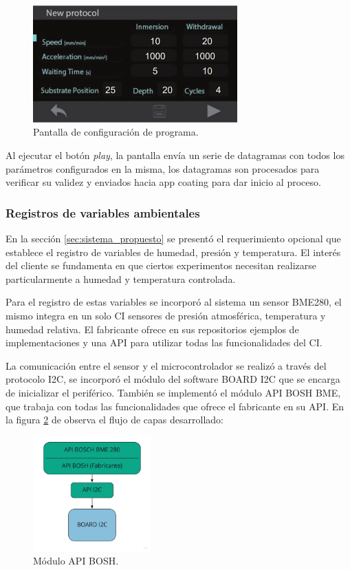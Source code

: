 \begin{figure}[h!]
	\centering
	\includegraphics[width=0.7\textwidth]{./Figures/pantalla.png}
	\caption{Pantalla de configuración de programa.}
	\label{fig:stone_a}
\end{figure}  

Al ejecutar el botón \textit{play}, la pantalla envía un serie de datagramas con todos los parámetros configurados en la misma, los datagramas son procesados para verificar su validez y enviados hacia app coating para dar inicio al proceso. 
 

\subsubsection{Registros de variables ambientales}

En la sección \ref{sec:sistema_propuesto} se presentó el requerimiento opcional que establece el registro de variables de humedad, presión y temperatura. El interés del cliente se fundamenta en que ciertos experimentos necesitan realizarse particularmente a humedad y temperatura controlada. 

Para el registro de estas variables se incorporó al sistema un sensor BME280, el mismo integra en un solo CI sensores de presión atmosférica, temperatura y humedad relativa. El fabricante ofrece en sus repositorios \citep{web_repositorio_api_bosh} ejemplos de implementaciones y una API para utilizar todas las funcionalidades del CI.

La comunicación entre el sensor y el microcontrolador se realizó a través del protocolo I2C, se incorporó el módulo del software BOARD I2C que se encarga de inicializar el periférico. También se implementó el módulo API BOSH BME, que trabaja con todas las funcionalidades que ofrece el fabricante en su API. En la figura \ref{fig:api_bosh} de observa el flujo de capas desarrollado:

\begin{figure}[h!]
	\centering
	\includegraphics[width=0.4\textwidth]{./Figures/api_bosh_bme.jpg}
	\caption{Módulo API BOSH.}
	\label{fig:api_bosh}
\end{figure}

